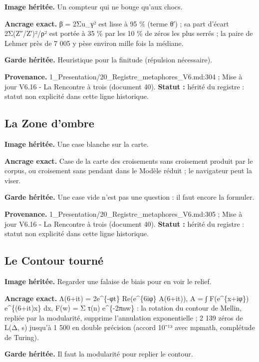 \documentclass[
  9pt,
  a4paper,
]{article}
\begin{document}
\textbf{Image héritée.} Un compteur qui ne bouge qu'aux chocs.

\textbf{Ancrage exact.} β = 2Σ\textbar u\_γ\textbar² est lisse à 95 \%
(terme θ′) ; sa part d'écart 2Σ(Z″/Z′)²/\textbar ρ\textbar² est portée à
35 \% par les 10 \% de zéros les plus serrés ; la paire de Lehmer près
de 7 005 y pèse environ mille fois la médiane.

\textbf{Garde héritée.} Heuristique pour la finitude (répulsion
nécessaire).

\textbf{Provenance.} 1\_Presentation/20\_Registre\_metaphores\_V6.md:304
; Mise à jour V6.16 - La Rencontre à trois (document 40). \textbf{Statut
:} hérité du registre : statut non explicité dans cette ligne
historique.

\hypertarget{la-zone-dombre}{%
\subsection{La Zone d'ombre}\label{la-zone-dombre}}

\textbf{Image héritée.} Une case blanche sur la carte.

\textbf{Ancrage exact.} Case de la carte des croisements sans croisement
produit par le corpus, ou croisement sans pendant dans le Modèle réduit
; le navigateur peut la viser.

\textbf{Garde héritée.} Une case vide n'est pas une question : il faut
encore la formuler.

\textbf{Provenance.} 1\_Presentation/20\_Registre\_metaphores\_V6.md:305
; Mise à jour V6.16 - La Rencontre à trois (document 40). \textbf{Statut
:} hérité du registre : statut non explicité dans cette ligne
historique.

\hypertarget{le-contour-tournuxe9}{%
\subsection{Le Contour tourné}\label{le-contour-tournuxe9}}

\textbf{Image héritée.} Regarder une falaise de biais pour en voir le
relief.

\textbf{Ancrage exact.} Λ(6+it) = 2e\^{}\{-φt\} Re(e\^{}\{6iφ\}
A(6+it)), A = ∫ F(e\^{}\{x+iφ\}) e\^{}\{(6+it)x\} dx, F(w) = Σ τ(n)
e\^{}\{-2πnw\} : la rotation du contour de Mellin, repliée par la
modularité, supprime l'annulation exponentielle ; 2 139 zéros de L(Δ, s)
jusqu'à 1 500 en double précision (accord 10⁻¹³ avec mpmath, complétude
de Turing).

\textbf{Garde héritée.} Il faut la modularité pour replier le contour.
\end{document}
